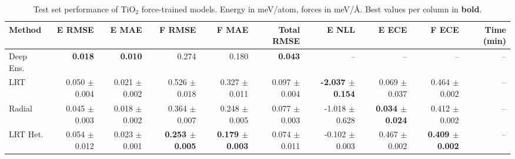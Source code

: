 \begin{table}
\centering
\caption{Test set performance of TiO$_2$ force-trained models. Energy in meV/atom, forces in meV/\AA{}. Best values per column in \textbf{bold}.}
\label{tab:tio2_results}
\begin{tabular}{lrrrrrrrrr}
\toprule
Method & E RMSE & E MAE & F RMSE & F MAE & Total RMSE & E NLL & E ECE & F ECE & Time (min) \\
\midrule
Deep Ens. & \textbf{0.018} & \textbf{0.010} & 0.274 & 0.180 & \textbf{0.043} & -- & -- & -- & -- \\
LRT & 0.050 $\pm$ 0.004 & 0.021 $\pm$ 0.002 & 0.526 $\pm$ 0.018 & 0.327 $\pm$ 0.011 & 0.097 $\pm$ 0.004 & \textbf{-2.037 $\pm$ 0.154} & 0.069 $\pm$ 0.037 & 0.464 $\pm$ 0.002 & -- \\
Radial & 0.045 $\pm$ 0.003 & 0.018 $\pm$ 0.002 & 0.364 $\pm$ 0.007 & 0.248 $\pm$ 0.005 & 0.077 $\pm$ 0.003 & -1.018 $\pm$ 0.628 & \textbf{0.034 $\pm$ 0.024} & 0.412 $\pm$ 0.002 & -- \\
LRT Het. & 0.054 $\pm$ 0.012 & 0.023 $\pm$ 0.001 & \textbf{0.253 $\pm$ 0.005} & \textbf{0.179 $\pm$ 0.003} & 0.074 $\pm$ 0.011 & -0.102 $\pm$ 0.003 & 0.467 $\pm$ 0.002 & \textbf{0.409 $\pm$ 0.002} & -- \\
\bottomrule
\end{tabular}
\end{table}